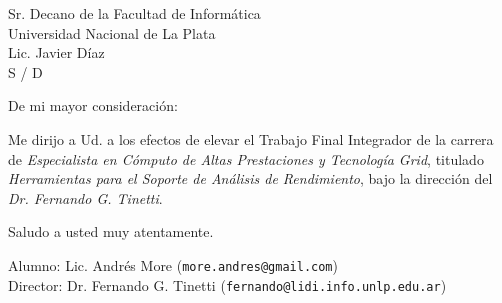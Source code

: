 \documentclass[a4paper]{letter}
\date{Córdoba, Agosto del 2013}
\begin{document}
\begin{letter}{Sr. Decano de la Facultad de Informática\\
Universidad Nacional de La Plata\\
Lic. Javier Díaz\\
S / D}

\opening{De mi mayor consideración:}

Me dirijo a Ud. a los efectos de elevar el Trabajo Final Integrador de la carrera de {\it Especialista en Cómputo de Altas Prestaciones y Tecnología Grid}, titulado {\it Herramientas para el Soporte de Análisis de Rendimiento}, bajo la dirección del {\it Dr. Fernando G. Tinetti}.

\closing{Saludo a usted muy atentamente.}

Alumno: Lic. Andrés More ({\tt more.andres@gmail.com})\\
Director: Dr. Fernando G. Tinetti ({\tt fernando@lidi.info.unlp.edu.ar})


\end{letter}
\end{document}
